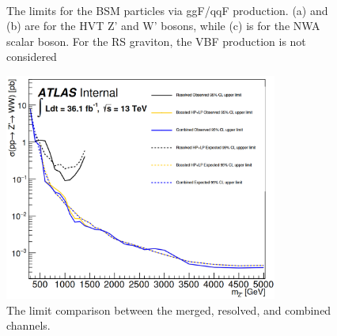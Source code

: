 \begin{figure}[ht]
	\centering
	\\
	\caption{The limits for the BSM particles via ggF/qqF production. (a) and (b) are for the HVT Z' and W' bosons, while (c) is for the NWA scalar boson. For the RS graviton, the VBF production is not considered}
	\label{Fig:limit_VBF}
\end{figure}
\begin{figure}[ht]
	\centering
	\includegraphics[width=0.8\textwidth]{Chapter4/limit_ResMerComb.png}
    \caption{The limit comparison between the merged, resolved, and combined channels.}
    \label{Fig:limit_comp_lvqq}
\end{figure}
